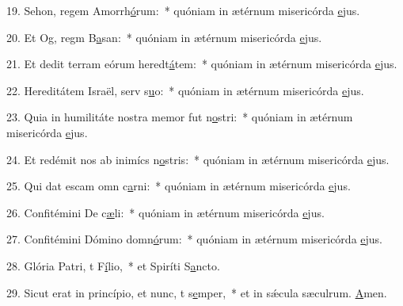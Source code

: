 19. Sehon, regem Amorrh\uline{ó}rum:~* quóniam in ætérnum misericórda \uline{e}jus.\par 
20. Et Og, regm B\uline{a}san:~* quóniam in ætérnum misericórda \uline{e}jus.\par 
21. Et dedit terram eórum heredt\uline{á}tem:~* quóniam in ætérnum misericórda \uline{e}jus.\par 
22. Hereditátem Israël, serv s\uline{u}o:~* quóniam in ætérnum misericórda \uline{e}jus.\par 
23. Quia in humilitáte nostra memor fut n\uline{o}stri:~* quóniam in ætérnum misericórda \uline{e}jus.\par 
24. Et redémit nos ab inimícs n\uline{o}stris:~* quóniam in ætérnum misericórda \uline{e}jus.\par 
25. Qui dat escam omn c\uline{a}rni:~* quóniam in ætérnum misericórda \uline{e}jus.\par 
26. Confitémini De c\uline{æ}li:~* quóniam in ætérnum misericórda \uline{e}jus.\par 
27. Confitémini Dómino domn\uline{ó}rum:~* quóniam in ætérnum misericórda \uline{e}jus.\par 
28. Glória Patri, t F\uline{í}lio,~* et Spiríti S\uline{a}ncto.\par 
29. Sicut erat in princípio, et nunc, t s\uline{e}mper,~* et in sǽcula sæculrum. \uline{A}men.\par 
